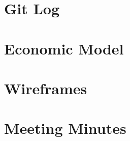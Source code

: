 \documentclass[]{report}
\begin{document}
	
	
	\newpage
	\begin{appendices}
		\chapter{Git Log}
		
		\chapter{Economic Model}
		
		\chapter{Wireframes}
		
		\chapter{Meeting Minutes}
		
	\end{appendices}
\end{document}
